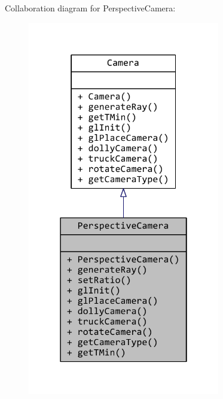 Collaboration diagram for Perspective\+Camera\+:
\nopagebreak
\begin{figure}[H]
\begin{center}
\leavevmode
\includegraphics[width=238pt]{classPerspectiveCamera__coll__graph}
\end{center}
\end{figure}
